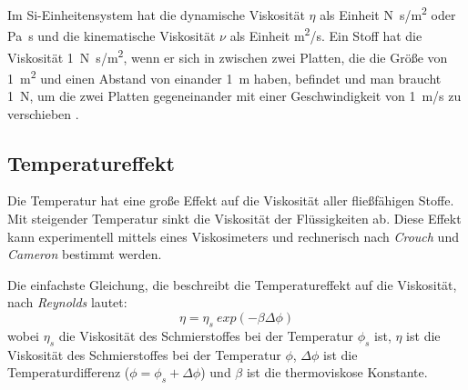 Im Si-Einheitensystem hat die dynamische Viskosität $\eta$ als Einheit \si{N.s/m^2} oder \si{\pascal.\s} und die kinematische Viskosität $\nu$ als Einheit \si{m^2/s}.
Ein Stoff hat die Viskosität \SI{1}{N.s/m^2}, wenn er sich in zwischen zwei Platten, die die Größe von \SI{1}{m^2} und einen Abstand von einander \SI{1}{m} haben, befindet und man braucht \SI{1}{N}, um die zwei Platten gegeneinander mit einer Geschwindigkeit von \SI{1}{m/s} zu verschieben \cite{viscosity_wiki}.

\subsection*{Temperatureffekt}
\label{sub:temperatureffekt}
Die Temperatur hat eine große Effekt auf die Viskosität aller fließfähigen Stoffe.
Mit steigender Temperatur sinkt die Viskosität der Flüssigkeiten ab.
Diese Effekt kann experimentell mittels eines Viskosimeters und rechnerisch nach \textit{Crouch} und \textit{Cameron} \cite{crouch_1961} bestimmt werden.

Die einfachste Gleichung, die beschreibt die Temperatureffekt auf die Viskosität, nach \textit{Reynolds} \cite{reynolds_1886} lautet:
\begin{equation}
    \eta = \eta_{s}  \ exp \left( -\beta  \Delta\phi \right)
    \label{eq:dynamische_viskositaet_reynold}
\end{equation}
%
wobei $\eta_{s}$ die Viskosität des Schmierstoffes bei der Temperatur $\phi_{s}$ ist, $\eta$ ist die Viskosität des Schmierstoffes bei der Temperatur $\phi$, $\Delta{\phi}$ ist die Temperaturdifferenz ($\phi = \phi_{s} + \Delta{\phi}$) und $\beta$ ist die thermoviskose Konstante.

